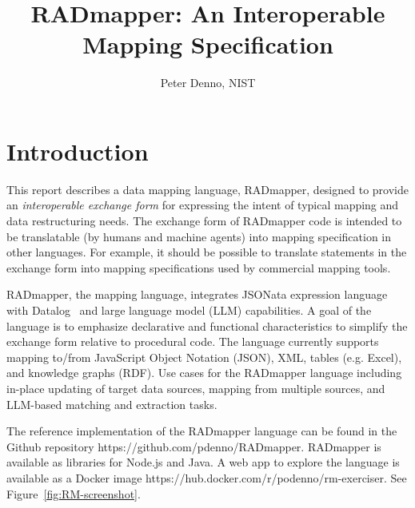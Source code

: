 \documentclass[10pt,letterpaper]{article} %
\begin{document}
\title{RADmapper: An Interoperable Mapping Specification}
\author{Peter Denno, NIST}
\date{} %
\maketitle{}

\section{Introduction}
This report describes a data mapping language, RADmapper, designed to provide an \textit{interoperable exchange form} for expressing the intent of typical mapping and data restructuring needs.
The exchange form of RADmapper code is intended to be translatable (by humans and machine agents) into mapping specification in other languages.
For example, it should be possible to translate statements in the exchange form into mapping specifications used by commercial mapping tools.

RADmapper, the mapping language, integrates JSONata expression language~\cite{Jsonata.org2021} with Datalog~\cite{Abiteboul1995a} and large language model (LLM) capabilities.
A goal of the language is to emphasize declarative and functional characteristics to simplify the exchange form relative to procedural code.
The language currently supports mapping to/from JavaScript Object Notation (JSON), XML, tables (e.g. Excel), and knowledge graphs (RDF).
Use cases for the RADmapper language including in-place updating of target data sources, mapping from multiple sources, and LLM-based matching and extraction tasks.

\begin{sloppypar} %
  The reference implementation of the RADmapper language can be found in the Github repository https://github.com/pdenno/RADmapper.
  RADmapper is available as libraries for Node.js and Java.
A web app to explore the language is available as a Docker image https://hub.docker.com/r/podenno/rm-exerciser.
See Figure~\ref{fig:RM-screenshot}.
\end{sloppypar}
\end{document}

